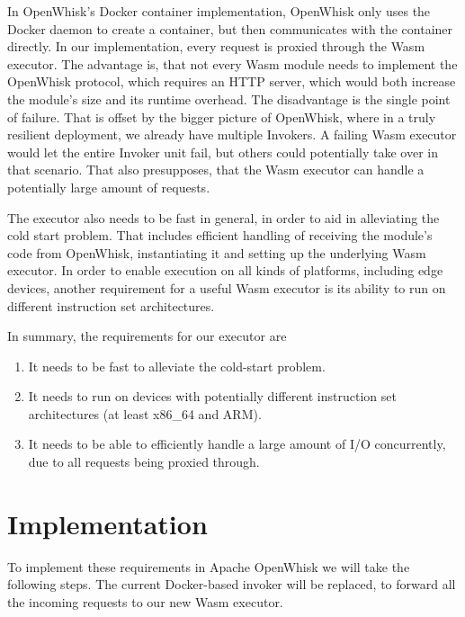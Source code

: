 
In OpenWhisk's Docker container implementation, OpenWhisk only uses the Docker daemon to create a container, but then communicates with the container directly. In our implementation, every request is proxied through the Wasm executor. The advantage is, that not every Wasm module needs to implement the OpenWhisk protocol, which requires an HTTP server, which would both increase the module's size and its runtime overhead. The disadvantage is the single point of failure. That is offset by the bigger picture of OpenWhisk, where in a truly resilient deployment, we already have multiple Invokers. A failing Wasm executor would let the entire Invoker unit fail, but others could potentially take over in that scenario. That also presupposes, that the Wasm executor can handle a potentially large amount of requests.


The executor also needs to be fast in general, in order to aid in alleviating the cold start problem. That includes efficient handling of receiving the module's code from OpenWhisk, instantiating it and setting up the underlying Wasm executor. In order to enable execution on all kinds of platforms, including edge devices, another requirement for a useful Wasm executor is its ability to run on different instruction set architectures.

In summary, the requirements for our executor are

\begin{enumerate}
    \item It needs to be fast to alleviate the cold-start problem.
    \item It needs to run on devices with potentially different instruction set architectures (at least x86\_64 and ARM).
    \item It needs to be able to efficiently handle a large amount of I/O concurrently, due to all requests being proxied through.
\end{enumerate}

\section{Implementation}

To implement these requirements in Apache OpenWhisk we will take the following steps. The current Docker-based invoker will be replaced, to forward all the incoming requests to our new Wasm executor. 

